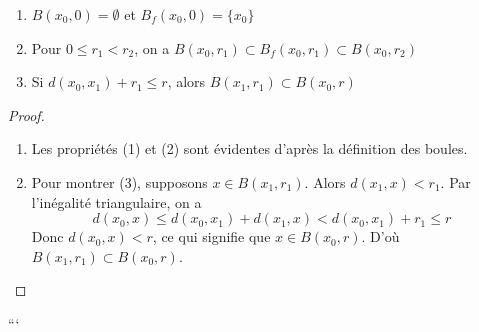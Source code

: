 \begin{lemma}
\begin{enumerate}
    \item $B(x_0, 0) = \emptyset$ et $B_f(x_0, 0) = \{x_0\}$
    \item Pour $0 \leq r_1 < r_2$, on a $B(x_0, r_1) \subset B_f(x_0, r_1) \subset B(x_0, r_2)$
    \item Si $d(x_0, x_1) + r_1 \leq r$, alors $B(x_1, r_1) \subset B(x_0, r)$
\end{enumerate}
\end{lemma}

\begin{proof}
\begin{enumerate}
    \item Les propriétés (1) et (2) sont évidentes d'après la définition des boules.

    \item Pour montrer (3), supposons $x \in B(x_1, r_1)$. Alors $d(x_1, x) < r_1$.
    Par l'inégalité triangulaire, on a
    \[
    d(x_0, x) \leq d(x_0, x_1) + d(x_1, x) < d(x_0, x_1) + r_1 \leq r
    \]
    Donc $d(x_0, x) < r$, ce qui signifie que $x \in B(x_0, r)$. D'où $B(x_1, r_1) \subset B(x_0, r)$.
\end{enumerate}
\end{proof}



```